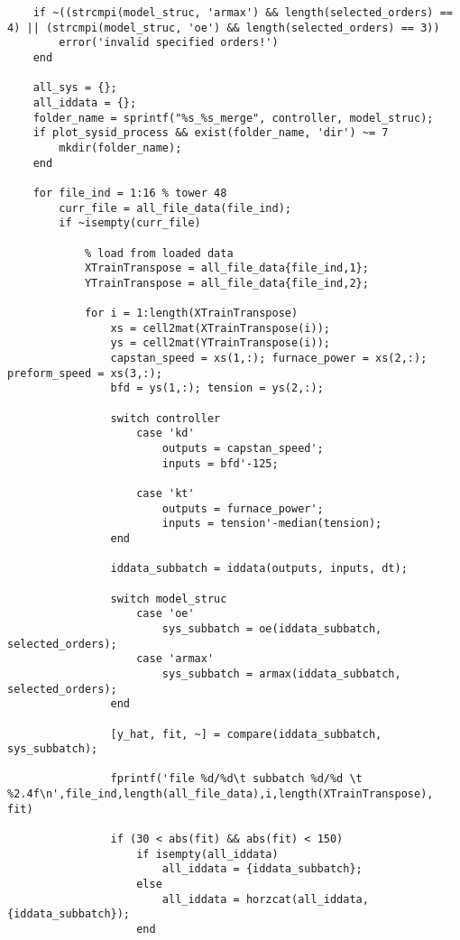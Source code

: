 \begin{lstlisting}
    if ~((strcmpi(model_struc, 'armax') && length(selected_orders) == 4) || (strcmpi(model_struc, 'oe') && length(selected_orders) == 3))
        error('invalid specified orders!')
    end
    
    all_sys = {};
    all_iddata = {};
    folder_name = sprintf("%s_%s_merge", controller, model_struc);
    if plot_sysid_process && exist(folder_name, 'dir') ~= 7
        mkdir(folder_name);
    end
    
    for file_ind = 1:16 % tower 48
        curr_file = all_file_data(file_ind);
        if ~isempty(curr_file)
    
            % load from loaded data
            XTrainTranspose = all_file_data{file_ind,1};
            YTrainTranspose = all_file_data{file_ind,2};
    
            for i = 1:length(XTrainTranspose)
                xs = cell2mat(XTrainTranspose(i));
                ys = cell2mat(YTrainTranspose(i));
                capstan_speed = xs(1,:); furnace_power = xs(2,:); preform_speed = xs(3,:);
                bfd = ys(1,:); tension = ys(2,:);
    
                switch controller
                    case 'kd'
                        outputs = capstan_speed';
                        inputs = bfd'-125;
    
                    case 'kt'
                        outputs = furnace_power';
                        inputs = tension'-median(tension);
                end
    
                iddata_subbatch = iddata(outputs, inputs, dt);
    
                switch model_struc
                    case 'oe'
                        sys_subbatch = oe(iddata_subbatch,  selected_orders);
                    case 'armax'
                        sys_subbatch = armax(iddata_subbatch,  selected_orders);
                end
    
                [y_hat, fit, ~] = compare(iddata_subbatch, sys_subbatch);
    
                fprintf('file %d/%d\t subbatch %d/%d \t %2.4f\n',file_ind,length(all_file_data),i,length(XTrainTranspose), fit)
    
                if (30 < abs(fit) && abs(fit) < 150)
                    if isempty(all_iddata)
                        all_iddata = {iddata_subbatch};
                    else
                        all_iddata = horzcat(all_iddata, {iddata_subbatch});
                    end
    

\end{lstlisting}
